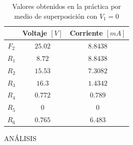 \documentclass[twocolumn]{IEEEtran}
\begin{document}
\begin{table}[H]
	\centering
\begin{tabular}[c]{|c||c|c|} \hline
 & Voltaje $[V]$ & Corriente $[mA]$ \\ \hline
$F_2$ & $25.02$ & $8.8438$ \\ \hline
$R_1$ & $8.72$ & $8.8438$ \\ \hline
$R_2$ & $15.53$ & $7.3082$ \\ \hline
$R_3$ & $16.3$ & $1.4342$ \\ \hline
$R_4$ & $0.772$ & $0.789$\\ \hline
$R_5$ & $0$ & $0$ \\ \hline
$R_6$ & $0.765$ & $6.483$ \\ \hline
\end{tabular}
	\caption{Valores obtenidos en la práctica por medio de superposición con $V_1 = 0$}
	\label{tab7}
\end{table}

\noindent
ANÁLISIS
\end{document}
